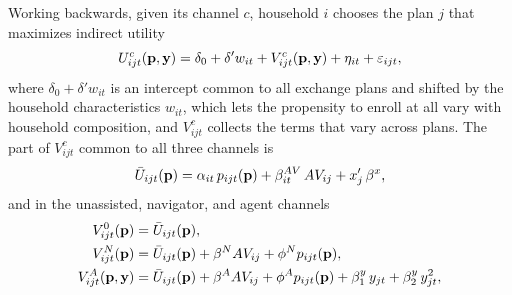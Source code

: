 \documentclass[12pt]{article}
\begin{document}
Working backwards, given its channel $c$, household $i$ chooses the plan $j$ that maximizes indirect utility
\begin{equation}
\label{eqn:utility_total}
	U^c_{ijt}({\bf p},{\bf y}) = \delta_0 + \delta' w_{it} + V^c_{ijt}({\bf p},{\bf y}) + \eta_{it} + \varepsilon_{ijt},
\end{equation}
where $\delta_0 + \delta' w_{it}$ is an intercept common to all exchange plans and shifted by the household characteristics $w_{it}$, which lets the propensity to enroll at all vary with household composition, and $V^c_{ijt}$ collects the terms that vary across plans. The part of $V^c_{ijt}$ common to all three channels is
\begin{equation}
\label{eqn:utility_common}
	\bar{U}_{ijt}({\bf p}) = \alpha_{it}\, p_{ijt}({\bf p}) + \beta^{AV}_{it}\, AV_{ij} + x'_{j}\, \beta^{x},
\end{equation}
and in the unassisted, navigator, and agent channels
\begin{equation}
\label{eqn:utility}
\begin{split}
V^{0}_{ijt}({\bf p}) &= \bar{U}_{ijt}({\bf p}), \\
V^{N}_{ijt}({\bf p}) &= \bar{U}_{ijt}({\bf p}) + \beta^{N} AV_{ij} + \phi^{N} p_{ijt}({\bf p}), \\
V^{A}_{ijt}({\bf p},{\bf y}) &= \bar{U}_{ijt}({\bf p}) + \beta^{A} AV_{ij} + \phi^{A} p_{ijt}({\bf p}) + \beta^{y}_{1}\, y_{jt} + \beta^{y}_{2}\, y_{jt}^{2},
\end{split}
\end{equation}
\end{document}
